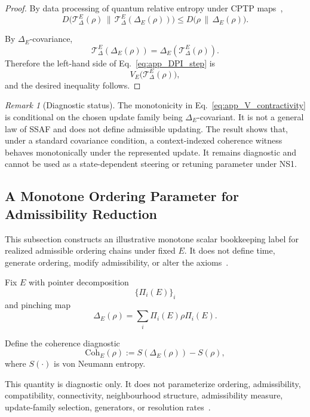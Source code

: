 \documentclass[aps,prx,onecolumn,11pt]{revtex4-2}
\theoremstyle{plain}
\theoremstyle{definition}
\theoremstyle{remark}
\newtheorem{remark}{Remark}
\begin{document}
\begin{proof}
By data processing of quantum relative entropy under CPTP
maps~\cite{Petz1986,Wilde2017,NielsenChuang2010},
\begin{equation}
D\!\bigl(
\mathcal{T}^E_\Delta(\rho)
\,\|\,
\mathcal{T}^E_\Delta(\Delta_E(\rho))
\bigr)
\leq
D\!\bigl(
\rho
\,\|\,
\Delta_E(\rho)
\bigr).
\label{eq:app_DPI_step}
\end{equation}

By \(\Delta_E\)-covariance,
\[
\mathcal{T}^E_\Delta(\Delta_E(\rho))
=
\Delta_E(\mathcal{T}^E_\Delta(\rho)).
\]
Therefore the left-hand side of
Eq.~\eqref{eq:app_DPI_step} is
\[
V_E\bigl(\mathcal{T}^E_\Delta(\rho)\bigr),
\]
and the desired inequality follows.
\end{proof}

\begin{remark}[Diagnostic status]
The monotonicity in Eq.~\eqref{eq:app_V_contractivity} is conditional
on the chosen update family being \(\Delta_E\)-covariant. It is not a
general law of SSAF and does not define admissible updating. The result
shows that, under a standard covariance condition, a context-indexed
coherence witness behaves monotonically under the represented update.
It remains diagnostic and cannot be used as a state-dependent steering
or retuning parameter under NS1.
\end{remark}

\subsection{A Monotone Ordering Parameter for Admissibility Reduction}
\label{app:ordering_parameter}

This subsection constructs an illustrative monotone scalar bookkeeping
label for realized admissible ordering chains under fixed \(E\). It
does not define time, generate ordering, modify admissibility, or alter
the axioms~\cite{Watrous2018,Wilde2017,NielsenChuang2010}.

Fix \(E\) with pointer decomposition
\[
\{\Pi_i(E)\}_i
\]
and pinching map
\[
\Delta_E(\rho)
=
\sum_i \Pi_i(E)\rho\Pi_i(E).
\]

Define the coherence diagnostic
\begin{equation}
\mathrm{Coh}_E(\rho)
:=
S(\Delta_E(\rho))-S(\rho),
\label{eq:relative_entropy_coherence_pointer}
\end{equation}
where \(S(\cdot)\) is von Neumann entropy.

This quantity is diagnostic only. It does not parameterize ordering,
admissibility, compatibility, connectivity, neighbourhood structure,
admissibility measure, update-family selection, generators, or
resolution rates~\cite{Baumgratz2014,ChitambarGour2019}.
\end{document}
